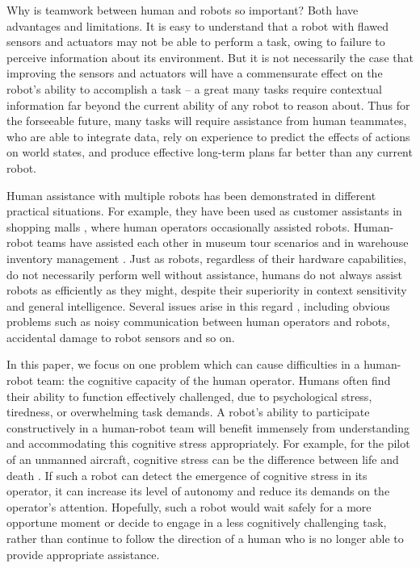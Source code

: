\documentclass{sig-alternate}
\begin{document}
Why is teamwork between human and robots so important?  Both have
advantages and limitations. It is easy to understand that a robot with
flawed sensors and actuators may not be able to perform a task, owing
to failure to perceive information about its environment.  But it is
not necessarily the case that improving the sensors and actuators will
have a commensurate effect on the robot's ability to accomplish a task
-- a great many tasks require contextual information far beyond the
current ability of any robot to reason about.  Thus for the forseeable
future, many tasks will require assistance from human teammates, who
are able to integrate data, rely on experience to predict the effects
of actions on world states, and produce effective long-term plans far
better than any current robot.

Human assistance with multiple robots has been demonstrated in
different practical situations. For example, they have been used as
customer assistants in shopping malls \cite{zheng2013supervisory,
  Kanda:2009:AGR:1514095.1514127}, where human operators occasionally
assisted robots. Human-robot teams have assisted each other in museum
tour scenarios \cite{thrun1999minerva} and in warehouse inventory
management \cite{wurman2008coordinating}.  Just as robots, regardless
of their hardware capabilities, do not necessarily perform well
without assistance, humans do not always assist robots as efficiently
as they might, despite their superiority in context sensitivity and
general intelligence.  Several issues arise in this regard
\cite{breazeal2004social}, including obvious problems such as noisy
communication between human operators and robots, accidental damage to
robot sensors and so on.

In this paper, we focus on one problem which can cause difficulties in
a human-robot team: the cognitive capacity of the human operator.
Humans often find their ability to function effectively challenged,
due to psychological stress, tiredness, or overwhelming task demands.
A robot's ability to participate constructively in a human-robot team
will benefit immensely from understanding and accommodating this
cognitive stress appropriately.  For example, for the pilot of an
unmanned aircraft, cognitive stress can be the difference between life
and death \cite{crandall2005validating}.  If such a robot can detect
the emergence of cognitive stress in its operator, it can increase its
level of autonomy and reduce its demands on the operator's attention.
Hopefully, such a robot would wait safely for a more opportune moment
or decide to engage in a less cognitively challenging task, rather
than continue to follow the direction of a human who is no longer able
to provide appropriate assistance.
\end{document}
